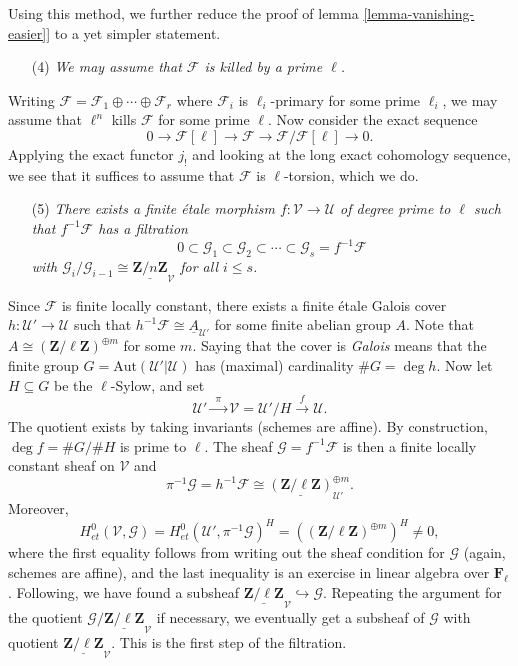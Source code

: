 \medskip\noindent
Using this method, we further reduce the proof of lemma
\ref{lemma-vanishing-easier}] to a yet simpler
statement.
\begin{enumerate}
\item[(4)]
{\it We may assume that $\mathcal{F}$ is killed by a prime $\ell$.}
\end{enumerate}
Writing $\mathcal{F} = \mathcal{F}_1 \oplus \cdots \oplus \mathcal{F}_r$ where
$\mathcal{F}_i$ is $\ell_i$-primary for some prime $\ell_i$, we may assume that
$\ell^n$ kills $\mathcal{F}$ for some prime $\ell$. Now consider the exact
sequence
$$
0 \to \mathcal{F}[\ell] \to \mathcal{F} \to \mathcal{F}/\mathcal{F}[\ell] \to 0.
$$
Applying the exact functor $j_!$ and looking at the long exact cohomology
sequence, we see that it suffices to assume that $\mathcal{F}$ is
$\ell$-torsion, which we do.
\begin{enumerate}
\item[(5)]
{\it There exists a finite \'etale morphism $f: \mathcal{V} \to \mathcal{U}$ of
degree prime to $\ell$ such that $f^{-1} \mathcal{F}$ has a filtration
$$
0 \subset \mathcal{G}_1 \subset \mathcal{G}_2 \subset \cdots \subset
\mathcal{G}_s = f^{-1} \mathcal{F}
$$
with $\mathcal{G}_i /\mathcal{G}_{i-1} \cong
\underline{\mathbf{Z}/n\mathbf{Z}}_\mathcal{V}$ for all $i \leq s$.}
\end{enumerate}
Since $\mathcal{F}$ is finite locally constant, there exists a finite \'etale
Galois cover $h : \mathcal{U}' \to \mathcal{U}$ such that $h^{-1} \mathcal{F}
\cong \underline{A}_{\mathcal{U}'}$ for some finite abelian group $A$. Note
that $A \cong (\mathbf{Z}/\ell\mathbf{Z})^{\oplus m}$ for some $m$. Saying that
the cover is {\it Galois} means that the finite group $G =
\text{Aut}(\mathcal{U}' | \mathcal{U})$ has (maximal) cardinality $\# G = \deg
h$. Now let $H \subseteq G$ be the $\ell$-Sylow, and set
$$
\mathcal{U}' \xrightarrow{\ \ \pi \ \ } \mathcal{V} = \mathcal{U}'/H
\xrightarrow{\ \ f \ \ } \mathcal{U}.
$$
The quotient exists by taking invariants (schemes are affine). By construction,
$\deg f = \#G/\#H$ is prime to $\ell$. The sheaf $\mathcal{G} = f^{-1}
\mathcal{F}$ is then a finite locally constant sheaf on $\mathcal{V}$ and
$$
\pi^{-1} \mathcal{G} = h^{-1}\mathcal{F} \cong
\underline{(\mathbf{Z}/\ell\mathbf{Z})}^{\oplus m}_{\mathcal{U}'}.
$$
Moreover,
$$
H_{et}^0(\mathcal{V}, \mathcal{G}) = H_{et}^0(\mathcal{U}',
\pi^{-1}\mathcal{G})^H = \left((\mathbf{Z}/\ell\mathbf{Z})^{\oplus m}\right)^H
\neq 0,
$$
where the first equality follows from writing out the sheaf condition for
$\mathcal{G}$ (again, schemes are affine), and the last inequality is an
exercise in linear algebra over $\mathbf{F}_\ell$. Following, we have found a
subsheaf $\underline{\mathbf{Z}/\ell\mathbf{Z}}_\mathcal{V} \hookrightarrow
\mathcal{G}$. Repeating the argument for the quotient $\mathcal{G}/
\underline{\mathbf{Z}/\ell\mathbf{Z}}_\mathcal{V}$ if necessary, we eventually
get a subsheaf of $\mathcal{G}$ with quotient
$\underline{\mathbf{Z}/\ell\mathbf{Z}}_\mathcal{V}$. This is the first step of
the filtration.

